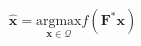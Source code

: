\documentclass[border=2pt,varwidth]{standalone}
\begin{document}
\[
\hat{\mathbf{x}} =
 \underset{\mathbf{x}\in\mathcal{Q}}{\text{argmax}}
 f(\mathbf{F}^* \mathbf{x})
\]
\end{document}
